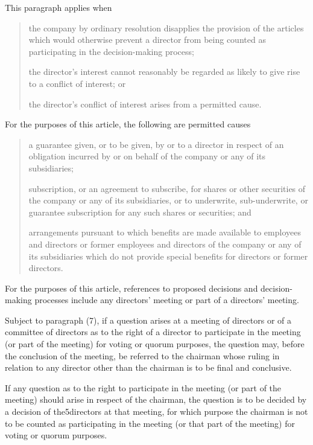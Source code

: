 \documentclass[letterpaper,10pt,english]{sphinxmanual}
\begin{document}
 This paragraph applies when
\begin{quote}

 the company by ordinary resolution disapplies the provision of the articles which would otherwise prevent a director from being counted as participating in the decision-making process;

 the director’s interest cannot reasonably be regarded as likely to give rise to a conflict of interest; or

 the director’s conflict of interest arises from a permitted cause.
\end{quote}

 For the purposes of this article, the following are permitted causes
\begin{quote}

 a guarantee given, or to be given, by or to a director in respect of an obligation incurred by or on behalf of the company or any of its subsidiaries;

 subscription, or an agreement to subscribe, for shares or other securities of the company or any of its subsidiaries, or to underwrite, sub-underwrite, or guarantee subscription for any such shares or securities; and

 arrangements pursuant to which benefits are made available to employees and directors or former employees and directors of the company or any of its subsidiaries which do not provide special benefits for directors or former directors.
\end{quote}

 For the purposes of this article, references to proposed decisions and decision-making processes include any directors’ meeting or part of a directors’ meeting.

 Subject to paragraph (7), if a question arises at a meeting of directors or of a committee of directors as to the right of a director to participate in the meeting (or part of the meeting) for voting or quorum purposes, the question may, before the conclusion of the meeting, be referred to the chairman whose ruling in relation to any director other than the chairman is to be final and conclusive.

 If any question as to the right to participate in the meeting (or part of the meeting) should arise in respect of the chairman, the question is to be decided by a decision of the5directors at that meeting, for which purpose the chairman is not to be counted as participating in the meeting (or that part of the meeting) for voting or quorum purposes.
\end{document}
